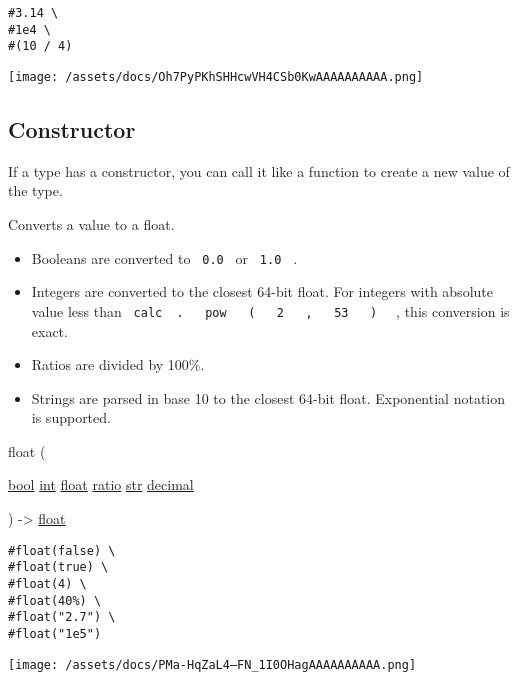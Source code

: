 \begin{verbatim}
#3.14 \
#1e4 \
#(10 / 4)
\end{verbatim}

\texttt{[image: /assets/docs/Oh7PyPKhSHHcwVH4CSb0KwAAAAAAAAAA.png]}

\subsection{\texorpdfstring{Constructor
{}}{Constructor }}\label{constructor}

\label{constructor-constructor-tooltip}
If a type has a constructor, you can call it like a function to create a
new value of the type.

Converts a value to a float.

\begin{itemize}
\tightlist
\item
  Booleans are converted to \texttt{\ 0.0\ } or \texttt{\ 1.0\ } .
\item
  Integers are converted to the closest 64-bit float. For integers with
  absolute value less than
  \texttt{\ calc\ }{\texttt{\ .\ }}\texttt{\ }{\texttt{\ pow\ }}\texttt{\ }{\texttt{\ (\ }}\texttt{\ }{\texttt{\ 2\ }}\texttt{\ }{\texttt{\ ,\ }}\texttt{\ }{\texttt{\ 53\ }}\texttt{\ }{\texttt{\ )\ }}\texttt{\ }
  , this conversion is exact.
\item
  Ratios are divided by 100\%.
\item
  Strings are parsed in base 10 to the closest 64-bit float. Exponential
  notation is supported.
\end{itemize}

{ float } (

{ \href{/docs/reference/foundations/bool/}{bool}
\href{/docs/reference/foundations/int/}{int}
\href{/docs/reference/foundations/float/}{float}
\href{/docs/reference/layout/ratio/}{ratio}
\href{/docs/reference/foundations/str/}{str}
\href{/docs/reference/foundations/decimal/}{decimal} }

) -\textgreater{} \href{/docs/reference/foundations/float/}{float}

\begin{verbatim}
#float(false) \
#float(true) \
#float(4) \
#float(40%) \
#float("2.7") \
#float("1e5")
\end{verbatim}

\texttt{[image: /assets/docs/PMa-HqZaL4--FN\_1I0OHagAAAAAAAAAA.png]}

